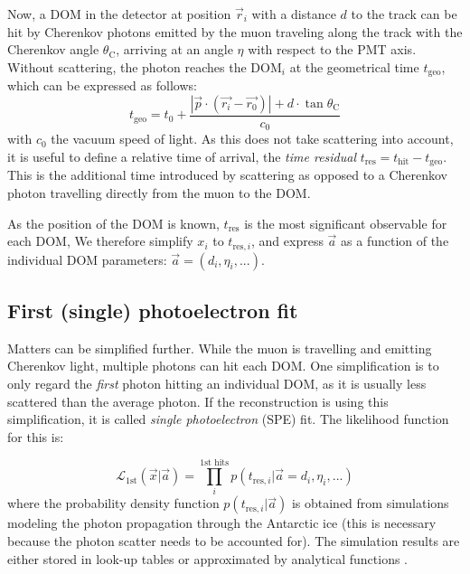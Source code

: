 Now, a DOM in the detector at position $\vec{r}_i$ with a distance $d$ to the track can be hit by Cherenkov photons emitted by the muon traveling along the track with the Cherenkov angle $\theta_\text{C}$, arriving at an angle $\eta$ with respect to the PMT axis. Without scattering, the photon reaches the $\text{DOM}_i$ at the geometrical time $t_\text{geo}$, which can be expressed as follows:
\begin{equation}
t_\text{geo} = t_0 + \frac{|\vec{p}\cdot(\vec{r_i}-\vec{r_0})|+d\cdot \tan{\theta_\text{C}}}{c_0}
\end{equation}
with $c_0$ the vacuum speed of light. As this does not take scattering into account, it is useful to define a relative time of arrival, the \textit{time residual} $t_\text{res} = t_\text{hit} - t_\text{geo}$. This is the additional time introduced by scattering as opposed to a Cherenkov photon travelling directly from the muon to the DOM.

As the position of the DOM is known, $t_\text{res}$ is the most significant observable for each DOM,  We therefore simplify $x_i$ to $t_{\text{res},i}$, and express $\vec{a}$ as a function of the individual DOM parameters: $\vec{a}= (d_i,\eta_i,...)$.


\subsection{First (single) photoelectron fit}
Matters can be simplified further. While the muon is travelling and emitting Cherenkov light, multiple photons can hit each DOM. One simplification is to only regard the \textit{first} photon hitting an individual DOM, as it is usually less scattered than the average photon. If the reconstruction is using this simplification, it is called \textit{single photoelectron} (SPE) fit. The likelihood function for this is:

\begin{equation}
\mathcal{L}_\text{1st}(\vec{x}|\vec{a}) = \prod_i^\text{1st hits} p(t_{\text{res},i}|\vec{a}=d_i, \eta_i,...)
\end{equation}
where the probability density function $p(t_{\text{res},i}|\vec{a})$ is obtained from simulations modeling the photon propagation through the Antarctic ice (this is necessary because the photon scatter needs to be accounted for). The simulation results are either stored in look-up tables or approximated by analytical functions \cite{Ahrens2004}. 

